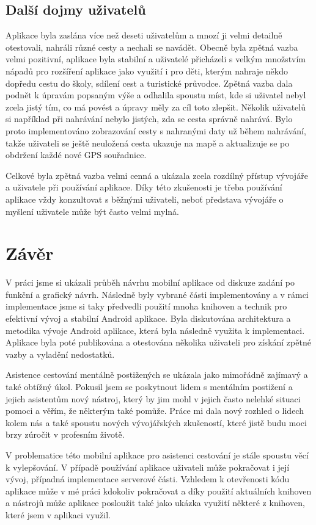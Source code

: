 \documentclass[czech,master,public,dept460,male,java,cpdeclaration]{diploma}
\begin{document}
\subsection{Další dojmy uživatelů}
Aplikace byla zaslána více než deseti uživatelům a mnozí ji velmi detailně otestovali, nahráli různé cesty
a nechali se navádět. Obecně byla zpětná vazba velmi pozitivní, aplikace byla stabilní a uživatelé přicházeli s velkým množstvím
nápadů pro rozšíření aplikace jako využití i pro děti, kterým nahraje někdo dopředu cestu do školy, sdílení cest
a turistické průvodce.
Zpětná vazba dala podnět k úpravám popsaným výše a odhalila spoustu míst, kde si uživatel nebyl
zcela jistý tím, co má povést a úpravy měly za cíl toto zlepšit.
Několik uživatelů si například při nahrávání nebylo jistých, zda se cesta správně nahrává. Bylo proto implementováno
zobrazování cesty s nahranými daty už během nahrávání, takže uživateli se ještě neuložená cesta ukazuje na
mapě a aktualizuje se po obdržení každé nové GPS souřadnice.

Celkové byla zpětná vazba velmi cenná a ukázala zcela rozdílný přístup vývojáře a uživatele při používání
aplikace. Díky této zkušenosti je třeba používání aplikace vždy konzultovat s běžnými uživateli, neboť
představa vývojáře o myšlení uživatele může být často velmi mylná.


\section{Závěr}
V práci jsme si ukázali průběh návrhu mobilní aplikace od diskuze zadání po funkční a grafický návrh.
Následně byly vybrané části implementovány a v rámci implementace jsme si taky předvedli použití mnoha knihoven a technik
pro efektivní vývoj a stabilní Android aplikace. Byla diskutována architektura a metodika vývoje Android aplikace,
která byla následně využita k implementaci. Aplikace byla poté publikována a otestována několika uživateli pro
 získání zpětné vazby a vyladění nedostatků.

Asistence cestování mentálně postižených se ukázala jako mimořádně zajímavý a také obtížný úkol.
Pokusil jsem se poskytnout lidem s mentálním postižení a jejich asistentům nový nástroj, který by
jim mohl v jejich často nelehké situaci pomoci a věřím, že některým také pomůže. Práce mi dala
nový rozhled o lidech kolem nás a také spoustu nových vývojářských zkušeností, které
jistě budu moci brzy zúročit v profesním životě.

V problematice této mobilní aplikace pro asistenci cestování je stále spoustu věcí k vylepšování.
V případě používání aplikace uživateli může pokračovat i její vývoj, případná implementace serverové části.
Vzhledem k otevřenosti kódu aplikace může v mé práci kdokoliv pokračovat a díky použití
aktuálních knihoven a nástrojů může aplikace posloužit také jako ukázka využití některé z knihoven,
které jsem v aplikaci využil.
\end{document}
